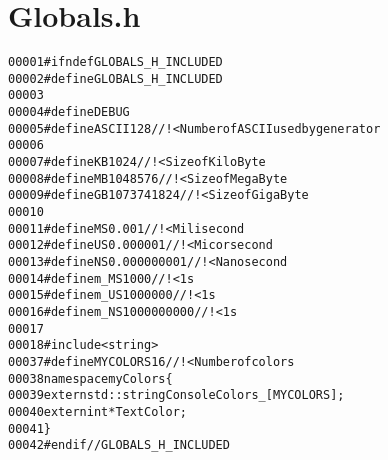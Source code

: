 \hypertarget{Globals_8h_source}{
\section{Globals.h}
}


\begin{footnotesize}\begin{alltt}
00001 \textcolor{preprocessor}{#ifndef GLOBALS\_H\_INCLUDED}
00002 \textcolor{preprocessor}{}\textcolor{preprocessor}{#define GLOBALS\_H\_INCLUDED}
00003 \textcolor{preprocessor}{}
00004 \textcolor{preprocessor}{    #define DEBUG}
00005 \textcolor{preprocessor}{}\textcolor{preprocessor}{    #define ASCII 128 //!< Number of ASCII used by generator}
00006 \textcolor{preprocessor}{}
00007 \textcolor{preprocessor}{    #define KB 1024 //!<Size of KiloByte}
00008 \textcolor{preprocessor}{}\textcolor{preprocessor}{    #define MB 1048576 //!<Size of MegaByte}
00009 \textcolor{preprocessor}{}\textcolor{preprocessor}{    #define GB 1073741824 //!<Size of GigaByte}
00010 \textcolor{preprocessor}{}
00011 \textcolor{preprocessor}{    #define MS 0.001 //!< Milisecond}
00012 \textcolor{preprocessor}{}\textcolor{preprocessor}{    #define US 0.000001 //!< Micorsecond}
00013 \textcolor{preprocessor}{}\textcolor{preprocessor}{    #define NS 0.000000001 //!< Nanosecond}
00014 \textcolor{preprocessor}{}\textcolor{preprocessor}{    #define m\_MS 1000 //!< 1s}
00015 \textcolor{preprocessor}{}\textcolor{preprocessor}{    #define m\_US 1000000 //!< 1s}
00016 \textcolor{preprocessor}{}\textcolor{preprocessor}{    #define m\_NS 1000000000 //!< 1s}
00017 \textcolor{preprocessor}{}
00018 \textcolor{preprocessor}{    #include <string>}
00037 \textcolor{preprocessor}{    #define MYCOLORS 16 //!< Number of colors}
00038 \textcolor{preprocessor}{}\textcolor{keyword}{namespace }myColors\{
00039     \textcolor{keyword}{extern} std::string ConsoleColors\_[MYCOLORS]; 
00040     \textcolor{keyword}{extern} \textcolor{keywordtype}{int} *TextColor; 
00041 \}
00042 \textcolor{preprocessor}{#endif // GLOBALS\_H\_INCLUDED}
\end{alltt}\end{footnotesize}
